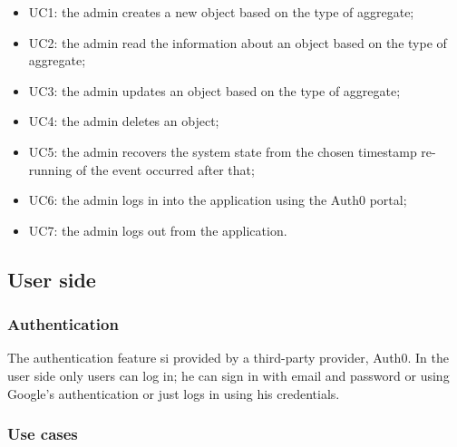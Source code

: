 \begin{itemize}
	\item UC1: the admin creates a new object based on the type of aggregate;
	\item UC2: the admin read the information about an object based on the type of aggregate;
	\item UC3: the admin updates an object based on the type of aggregate;
	\item UC4: the admin deletes an object;
	\item UC5: the admin recovers the system state from the chosen timestamp re-running of the event occurred after that; 
	\item UC6: the admin logs in into the application using the Auth0 portal;
	\item UC7: the admin logs out from the application.
\end{itemize}
	

\subsection{User side}
\subsubsection{Authentication}
The authentication feature si provided by a third-party provider, Auth0. In the user side only users can log in; he can sign in with email and password or using Google's authentication or just logs in using his credentials.
\subsubsection{Use cases}

